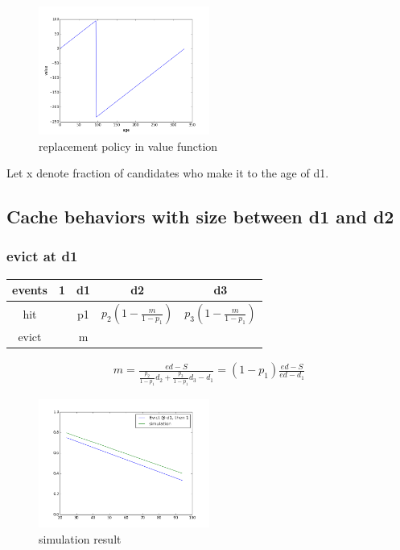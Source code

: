 \documentclass[12pt, letterpaper]{article}
\begin{document}
\begin{figure}[H]
\centering
\includegraphics[width=0.5\textwidth]{evict_d2.png}
\caption{replacement policy in value function}
\end{figure}

Let x denote fraction of candidates who make it to the age of d1.

\subsection{Cache behaviors with size between d1 and d2}

\subsubsection{evict at d1}
\label{sec:policyd1}


\begin{center}
\begin{tabular}{c | c c c c}
\hline
events & 1 & d1 & d2 & d3 \\
\hline
hit & & p1 & $p_2 (1-\frac{m}{1-p_1}) $ & $p_3(1-\frac{m}{1-p_1}) $ \\
evict & & m & & \\
\hline
\end{tabular}
\end{center}

\begin{equation}
\begin{aligned}
m = \frac{ed-S}{\frac{p_2}{1-p_1} d_2 + \frac{p_3}{1-p_1} d_3 - d_1}
= (1-p_1) \frac{ed-S}{ed-d_1}
\end{aligned}
\end{equation}

\begin{figure}[H]
\centering
\includegraphics[width=0.5\textwidth]{sim_d1.png}
\caption{simulation result}
\end{figure}
\end{document}
